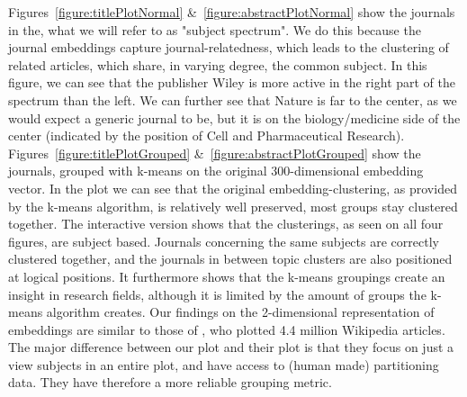 \documentclass[../../Thesis.tex]{subfiles}
\begin{document}
\begin{jumpin}
Figures~\ref{figure:titlePlotNormal} \&~\ref{figure:abstractPlotNormal} show the journals in the, what we will refer to as "subject spectrum". We do this because the journal embeddings capture journal-relatedness, which leads to the clustering of related articles, which share, in varying degree, the common subject. In this figure, we can see that the publisher Wiley is more active in the right part of the spectrum than the left. We can further see that Nature is far to the center, as we would expect a generic journal to be, but it is on the biology/medicine side of the center (indicated by the position of Cell and Pharmaceutical Research).\\
Figures~\ref{figure:titlePlotGrouped} \&~\ref{figure:abstractPlotGrouped} show the journals, grouped with k-means on the original 300-dimensional embedding vector. In the plot we can see that the original embedding-clustering, as provided by the k-means algorithm, is relatively well preserved, most groups stay clustered together. 
The interactive version shows that the clusterings, as seen on all four figures, are subject based. Journals concerning the same subjects are correctly clustered together, and the journals in between topic clusters are also positioned at logical positions. It furthermore shows that the k-means groupings create an insight in research fields, although it is limited by the amount of groups the k-means algorithm creates. Our findings on the 2-dimensional representation of embeddings are similar to those of \citet{dai2015document}, who plotted 4.4 million Wikipedia articles. The major difference between our plot and their plot is that they focus on just a view subjects in an entire plot, and have access to (human made) partitioning data. They have therefore a more reliable grouping metric.
\end{jumpin}
\end{document}
